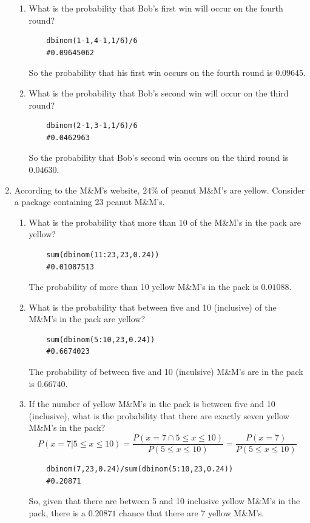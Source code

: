 \documentclass{article}
\begin{document}
\begin{enumerate}
\begin{enumerate}[label= (\alph*)]
\item What is the probability that Bob's first win will occur on the fourth round?

\begin{verbatim}
    dbinom(1-1,4-1,1/6)/6
    #0.09645062
\end{verbatim}

So the probability that his first win occurs on the fourth round is $0.09645$.

\item What is the probability that Bob's second win will occur on the third round?

\begin{verbatim}
    dbinom(2-1,3-1,1/6)/6
    #0.0462963
\end{verbatim}

So the probability that Bob's second win occurs on the third round is $0.04630$.

\end{enumerate}
\item According to the M\&M's website, $24\%$ of peanut M\&M's are yellow. Consider a package
containing 23 peanut M\&M's.
\begin{enumerate}[label= (\alph*)] 
 
\item What is the probability that more than 10 of the M\&M's in the pack are yellow?

\begin{verbatim}
    sum(dbinom(11:23,23,0.24))
    #0.01087513
\end{verbatim}

The probability of more than 10 yellow M\&M's in the pack is $0.01088$.

\item What is the probability that between five and 10 (inclusive) of the M\&M's in the pack
are yellow?

\begin{verbatim}
    sum(dbinom(5:10,23,0.24))
    #0.6674023
\end{verbatim}
The probability of between five and 10 (inculsive) M\&M's are in the pack is $0.66740$.
\item If the number of yellow M\&M's in the pack is between five and 10 (inclusive), what is
the probability that there are exactly seven yellow M\&M's in the pack?
\[P(x=7|5\leq x\leq10)=\frac{P(x=7\cap 5\leq x\leq 10)}{P(5\leq x\leq10)}=\frac{P(x=7)}{P(5\leq x\leq10)}\]
\begin{verbatim}
    dbinom(7,23,0.24)/sum(dbinom(5:10,23,0.24))
    #0.20871
\end{verbatim}
So, given that there are between 5 and 10 inclusive yellow M\&M's in the pack, there is a $0.20871$ chance that there are 7 yellow M\&M's.
\end{enumerate}
\end{enumerate}
\end{document}

